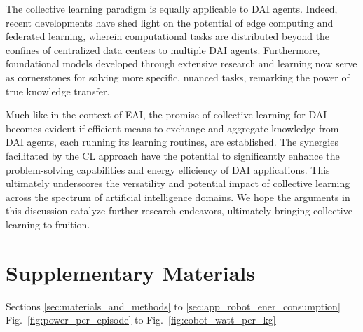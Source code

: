 \documentclass[12pt]{article}
\begin{document}
The collective learning paradigm is equally applicable to DAI agents. Indeed, recent developments have shed light on the potential of edge computing and federated learning, wherein computational tasks are distributed beyond the confines of centralized data centers to multiple DAI agents. Furthermore, foundational models developed through extensive research and learning now serve as cornerstones for solving more specific, nuanced tasks, remarking the power of true knowledge transfer.

Much like in the context of EAI, the promise of collective learning for DAI becomes evident if efficient means to exchange and aggregate knowledge from DAI agents, each running its learning routines, are established. The synergies facilitated by the CL approach have the potential to significantly enhance the problem-solving capabilities and energy efficiency of DAI applications. This ultimately underscores the versatility and potential impact of collective learning across the spectrum of artificial intelligence domains. We hope the arguments in this discussion catalyze further research endeavors, ultimately bringing collective learning to fruition.

\section*{Supplementary Materials}
Sections \ref{sec:materials_and_methods} to \ref{sec:app_robot_ener_consumption}\\
Fig.~\ref{fig:power_per_episode} to Fig.~\ref{fig:cobot_watt_per_kg}

\renewcommand\refname{References and Notes}


\end{document}
